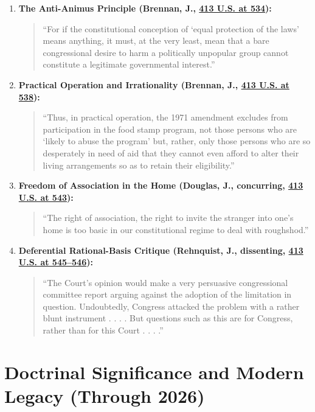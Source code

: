 \documentclass[12pt]{article}
\begin{document}
\begin{enumerate}
  \item \textbf{The Anti-Animus Principle (Brennan, J., \href{https://supreme.justia.com/cases/federal/us/413/528/}{413 U.S. at 534}):}
  \begin{quote}
    ``For if the constitutional conception of `equal protection of the laws' means anything, it must, at the very least, mean that a bare congressional desire to harm a politically unpopular group cannot constitute a legitimate governmental interest.''
  \end{quote}

  \item \textbf{Practical Operation and Irrationality (Brennan, J., \href{https://supreme.justia.com/cases/federal/us/413/528/}{413 U.S. at 538}):}
  \begin{quote}
    ``Thus, in practical operation, the 1971 amendment excludes from participation in the food stamp program, not those persons who are `likely to abuse the program' but, rather, only those persons who are so desperately in need of aid that they cannot even afford to alter their living arrangements so as to retain their eligibility.''
  \end{quote}

  \item \textbf{Freedom of Association in the Home (Douglas, J., concurring, \href{https://supreme.justia.com/cases/federal/us/413/528/}{413 U.S. at 543}):}
  \begin{quote}
    ``The right of association, the right to invite the stranger into one's home is too basic in our constitutional regime to deal with roughshod.''
  \end{quote}

  \item \textbf{Deferential Rational-Basis Critique (Rehnquist, J., dissenting, \href{https://supreme.justia.com/cases/federal/us/413/528/}{413 U.S. at 545--546}):}
  \begin{quote}
    ``The Court's opinion would make a very persuasive congressional committee report arguing against the adoption of the limitation in question. Undoubtedly, Congress attacked the problem with a rather blunt instrument . . . . But questions such as this are for Congress, rather than for this Court . . . .''
  \end{quote}
\end{enumerate}

\section{Doctrinal Significance and Modern Legacy (Through 2026)}
\end{document}
